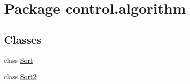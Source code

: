 \hypertarget{namespacecontrol_1_1algorithm}{}\section{Package control.\+algorithm}
\label{namespacecontrol_1_1algorithm}
\subsection*{Classes}
\begin{DoxyCompactItemize}
\item 
class \mbox{\hyperlink{classcontrol_1_1algorithm_1_1_sort}{Sort}}
\item 
class \mbox{\hyperlink{classcontrol_1_1algorithm_1_1_sort2}{Sort2}}
\end{DoxyCompactItemize}

